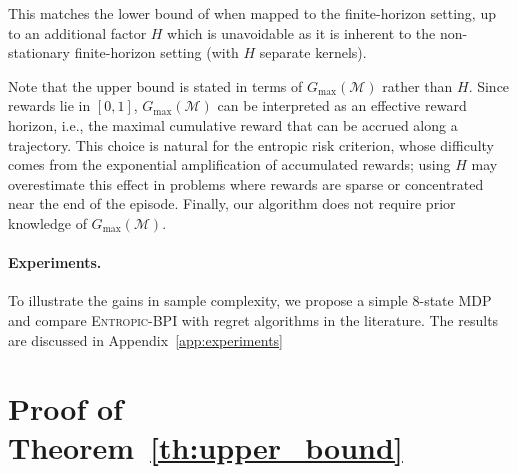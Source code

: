 \documentclass[final,12pt]{colt2026} %
\begin{document}
This matches the lower bound of \citet{MortensenTalebi2025} when mapped to the finite-horizon setting, up to an additional factor $H$ which is unavoidable as it is inherent to the non-stationary finite-horizon setting (with $H$ separate kernels). 


Note that the upper bound is stated in terms of $G_{\max}(\mathcal{M})$ rather than $H$. Since rewards lie in $[0,1]$, $G_{\max}(\mathcal{M})$ can be interpreted as an effective reward horizon, i.e., the maximal cumulative reward that can be accrued along a trajectory. This choice is natural for the entropic risk criterion, whose difficulty comes from the exponential amplification of accumulated rewards; using $H$ may overestimate this effect in problems where rewards are sparse or concentrated near the end of the episode. Finally, our algorithm does not require prior knowledge of $G_{\max}(\mathcal{M})$. 

\paragraph{Experiments. }  To illustrate the gains in sample complexity, we propose a simple 8-state MDP and compare \textsc{Entropic-BPI} with regret algorithms in the literature. The results are discussed in Appendix~\ref{app:experiments}

\section{Proof of Theorem~\ref{th:upper_bound}}



\end{document}
